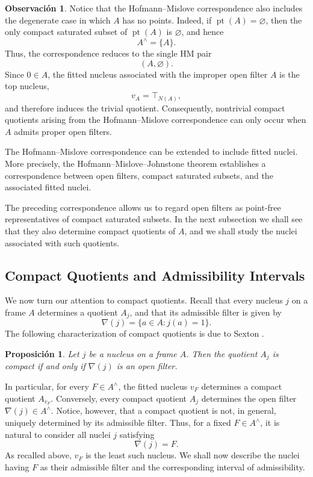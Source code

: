 \documentclass[11pt]{amsart}
\DeclareMathOperator{\pt}{pt}
\theoremstyle{plain}
\newtheorem{prop}[thm]{Proposición}
\theoremstyle{definition}
\newtheorem{obs}[thm]{Observación}
\begin{document}
\begin{obs}\label{Obs1}
Notice that the Hofmann--Mislove correspondence also includes the
degenerate case in which $A$ has no points. Indeed, if
$\pt(A)=\varnothing$, then the only compact saturated subset of
$\pt(A)$ is $\varnothing$, and hence
\[
    A^\wedge=\{A\}.
\]
Thus, the correspondence reduces to the single HM pair
\[
    (A,\varnothing).
\]
Since $0\in A$, the fitted nucleus associated with the improper open
filter $A$ is the top nucleus,
\[
    v_A=\top_{N(A)},
\]
and therefore induces the trivial quotient. Consequently, nontrivial
compact quotients arising from the Hofmann--Mislove correspondence can
only occur when $A$ admits proper open filters.
\end{obs}

The Hofmann--Mislove correspondence can be extended to include fitted nuclei. More precisely, the Hofmann--Mislove--Johnstone theorem establishes a correspondence 
between open filters, compact saturated subsets, and the associated fitted nuclei.

The preceding correspondence allows us to regard open filters as point-free representatives of compact saturated subsets. 
In the next subsection we shall see that they also determine compact quotients of \(A\), and we shall study the nuclei associated with such quotients.

\subsection{Compact Quotients and Admissibility Intervals}
We now turn our attention to compact quotients. Recall that every nucleus \(j\) on a frame \(A\) determines a quotient \(A_j\), and that its admissible filter is given by
\[
\nabla(j)=\{a\in A:j(a)=1\}.
\]
The following characterization of compact quotients is due to Sexton
\cite[Lemma 5.17]{Sexton2000}.
\begin{prop}
	Let \(j\) be a nucleus on a frame \(A\). Then the quotient \(A_j\) is compact if and only if \(\nabla(j)\) is an open filter.
\end{prop}

In particular, for every \(F\in A^\wedge\), the fitted nucleus \(v_F\) determines a compact quotient \(A_{v_F}\). Conversely, every compact quotient \(A_j\) determines the open filter \(\nabla(j)\in A^\wedge\).
Notice, however, that a compact quotient is not, in general, uniquely determined by its admissible filter. Thus, for a fixed \(F\in A^\wedge\), it is natural to consider all nuclei \(j\) satisfying
\[
\nabla(j)=F.
\]
As recalled above, \(v_F\) is the least such nucleus. We shall now describe the nuclei having \(F\) as their admissible filter and the corresponding interval of admissibility.
\end{document}
